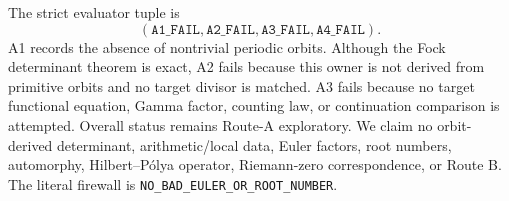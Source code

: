 \documentclass[10pt]{article}
\begin{document}
The strict evaluator tuple is
\[
 (\texttt{A1\_FAIL},\texttt{A2\_FAIL},
   \texttt{A3\_FAIL},\texttt{A4\_FAIL}).
\]
A1 records the absence of nontrivial periodic orbits.  Although the Fock
determinant theorem is exact, A2 fails because this owner is not derived from
primitive orbits and no target divisor is matched.  A3 fails because no target
functional equation, Gamma factor, counting law, or continuation comparison
is attempted.  Overall status remains Route-A exploratory.
We claim no orbit-derived determinant,
arithmetic/local data, Euler factors, root numbers, automorphy,
Hilbert--P\'olya operator, Riemann-zero correspondence, or Route B.  The
literal firewall is \texttt{NO\_BAD\_EULER\_OR\_ROOT\_NUMBER}.
\end{document}
